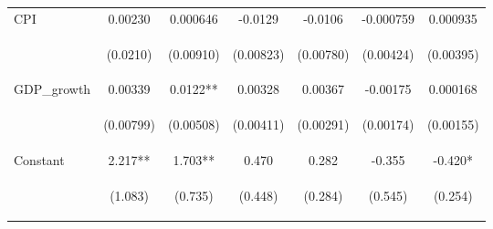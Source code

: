 \documentclass[]{article}
\begin{document}
\begin{center}
\begin{tabular}{lcccccc}
CPI & 0.00230 & 0.000646 & -0.0129 & -0.0106 & -0.000759 & 0.000935 \\
\vspace{4pt} & \begin{footnotesize}(0.0210)\end{footnotesize} & \begin{footnotesize}(0.00910)\end{footnotesize} & \begin{footnotesize}(0.00823)\end{footnotesize} & \begin{footnotesize}(0.00780)\end{footnotesize} & \begin{footnotesize}(0.00424)\end{footnotesize} & \begin{footnotesize}(0.00395)\end{footnotesize} \\
GDP\_growth & 0.00339 & 0.0122** & 0.00328 & 0.00367 & -0.00175 & 0.000168 \\
\vspace{4pt} & \begin{footnotesize}(0.00799)\end{footnotesize} & \begin{footnotesize}(0.00508)\end{footnotesize} & \begin{footnotesize}(0.00411)\end{footnotesize} & \begin{footnotesize}(0.00291)\end{footnotesize} & \begin{footnotesize}(0.00174)\end{footnotesize} & \begin{footnotesize}(0.00155)\end{footnotesize} \\
Constant & 2.217** & 1.703** & 0.470 & 0.282 & -0.355 & -0.420* \\
 & \begin{footnotesize}(1.083)\end{footnotesize} & \begin{footnotesize}(0.735)\end{footnotesize} & \begin{footnotesize}(0.448)\end{footnotesize} & \begin{footnotesize}(0.284)\end{footnotesize} & \begin{footnotesize}(0.545)\end{footnotesize} & \begin{footnotesize}(0.254)\end{footnotesize} \\

\end{tabular}
\end{center}
\end{document}
